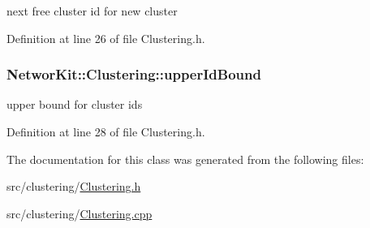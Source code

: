 next free cluster id for new cluster 



Definition at line 26 of file Clustering.\-h.

\hypertarget{class_networ_kit_1_1_clustering_a6fc3b70d463ec65ef29ca5520973d856}{
\subsubsection[{upper\-Id\-Bound}]{ Networ\-Kit\-::\-Clustering\-::upper\-Id\-Bound\hspace{0.3cm}{\ttfamily [protected]}}}\label{class_networ_kit_1_1_clustering_a6fc3b70d463ec65ef29ca5520973d856}


upper bound for cluster ids 



Definition at line 28 of file Clustering.\-h.



The documentation for this class was generated from the following files\-:\begin{DoxyCompactItemize}
\item 
src/clustering/\hyperlink{_clustering_8h}{Clustering.\-h}\item 
src/clustering/\hyperlink{_clustering_8cpp}{Clustering.\-cpp}\end{DoxyCompactItemize}
